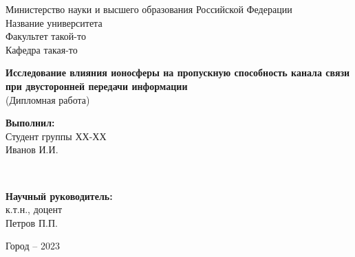 \documentclass[a4paper,14pt]{extreport} %
\begin{document}
\begin{titlepage}
    \begin{center}
        \vspace*{1cm}
        
        \large
        Министерство науки и высшего образования Российской Федерации \\
        Название университета \\
        Факультет такой-то \\
        Кафедра такая-то \\
        
        \vspace{2cm}
        
        \LARGE
        \textbf{Исследование влияния ионосферы на пропускную способность канала связи при двусторонней передачи информации} \\
        \large
        (Дипломная работа) \\
        
        \vspace{2cm}
        
        \begin{minipage}{0.4\textwidth}
            \begin{flushleft}
                \large
                \textbf{Выполнил:} \\
                Студент группы ХХ-ХХ \\
                Иванов И.И. \\
            \end{flushleft}
        \end{minipage}
        ~
        \begin{minipage}{0.4\textwidth}
            \begin{flushright}
                \large
                \textbf{Научный руководитель:} \\
                к.т.н., доцент \\
                Петров П.П. \\
            \end{flushright}
        \end{minipage}
        
        \vfill
        
        \large
        Город – 2023
    \end{center}
\end{titlepage}

\tableofcontents
\end{document}
